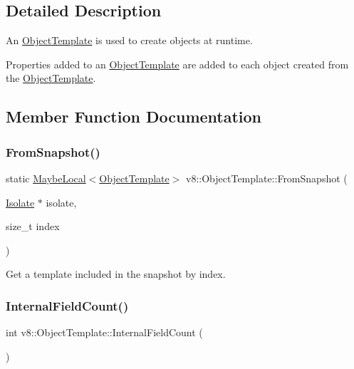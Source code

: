 \subsection{Detailed Description}
An \mbox{\hyperlink{classv8_1_1ObjectTemplate}{Object\+Template}} is used to create objects at runtime.

Properties added to an \mbox{\hyperlink{classv8_1_1ObjectTemplate}{Object\+Template}} are added to each object created from the \mbox{\hyperlink{classv8_1_1ObjectTemplate}{Object\+Template}}. 

\subsection{Member Function Documentation}
\mbox{\label{classv8_1_1ObjectTemplate_a7899f31276e3ca69358005e360e3bc27}} 
\subsubsection{\texorpdfstring{From\+Snapshot()}{FromSnapshot()}}
{\footnotesize\ttfamily static \mbox{\hyperlink{classv8_1_1MaybeLocal}{Maybe\+Local}}$<$\mbox{\hyperlink{classv8_1_1ObjectTemplate}{Object\+Template}}$>$ v8\+::\+Object\+Template\+::\+From\+Snapshot (\begin{DoxyParamCaption}\item[{\mbox{\hyperlink{classv8_1_1Isolate}{Isolate}} $\ast$}]{isolate,  }\item[{size\+\_\+t}]{index }\end{DoxyParamCaption})\hspace{0.3cm}{\ttfamily [static]}}

Get a template included in the snapshot by index. \mbox{\label{classv8_1_1ObjectTemplate_a43de785d594d8c01b18230b1aa79e31c}} 
\subsubsection{\texorpdfstring{Internal\+Field\+Count()}{InternalFieldCount()}}
{\footnotesize\ttfamily int v8\+::\+Object\+Template\+::\+Internal\+Field\+Count (\begin{DoxyParamCaption}{ }\end{DoxyParamCaption})}

